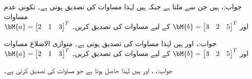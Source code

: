 جواب:،  ہیں جن سے  ملتا ہے جبکہ   ہیں لہٰذا مساوات  کی تصدیق ہوتی ہے۔
\quad تکونی عدم مساوات\\
\begin{math}
\bM{a}=\begin{bmatrix}2&1&3\end{bmatrix}^T
\end{math}
اور
\begin{math}
\bM{b}=\begin{bmatrix}3&2&5\end{bmatrix}^T
\end{math}
کے لیے مساوات  کی تصدیق کریں۔

جواب:،  اور  ہیں لہٰذا مساوات  کی تصدیق ہوتی ہے۔
\quad متوازی الاضلاع مساوات\\
\begin{math}
\bM{a}=\begin{bmatrix}2&1&3\end{bmatrix}^T
\end{math}
اور
\begin{math}
\bM{b}=\begin{bmatrix}3&2&5\end{bmatrix}^T
\end{math}
کے لیے مساوات  کی تصدیق کریں۔

جواب:، ،    اور
  ہیں لہٰذا  حاصل ہوتا ہے جو  مساوات  کی تصدیق کرتی ہے۔

